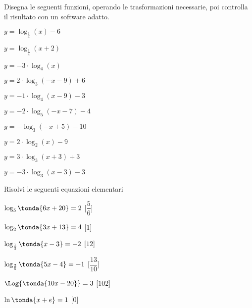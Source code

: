 \begin{esercizio}\label{ese:}
 Disegna le seguenti funzioni, operando le trasformazioni necessarie, poi 
controlla il risultato con un software adatto.
\begin{multicols}{2}
 \begin{enumeratea}
  \item  \(y=  \log_{\frac{1}{4}}\left(x \right) -6\)
  \item  \(y=  \log_{\frac{1}{4}}\left(x+2\right)\)
  \item  \(y=-3 \cdot \log_{4}\left(x\right)\)
  \item  \(y= 2 \cdot \log_{3}\left(-x-9\right) +6\)
  \item  \(y=-1 \cdot \log_{4}\left(x-9\right) -3\)
  \item  \(y=-2 \cdot \log_{5}\left(-x-7\right) -4\)
  \item  \(y= - \log_{3}\left(-x+5\right) -10\)
  \item  \(y= 2 \cdot \log_{2}\left(x \right) -9\)
  \item  \(y= 3 \cdot \log_{3}\left(x+3\right) +3\)
  \item  \(y= -3 \cdot \log_{3}\left(x-3\right) -3\)
 \end{enumeratea}
\end{multicols}
\end{esercizio}


\begin{esercizio}\label{ese:}
 Risolvi le seguenti equazioni elementari
\begin{multicols}{2}
 \begin{enumeratea}
  \item  \(\log_{5}{\tonda{6 x +20}} = 2\)
   \hfill [\( \dfrac{5}{6}\)]
  \item  \(\log_{2}{\tonda{3 x +13}} = 4\)
   \hfill [\( 1\)]
   \item  \(\log_{\frac{1}{3}}{\tonda{x-3}} = -2\)
   \hfill [\(12\)]
   \item  \(\log_{\frac{2}{5}}{\tonda{5 x -4}} = -1\)
   \hfill [\( \dfrac{13}{10}\)]
   \item  \(\Log{\tonda{10x-20}} = 3\)
   \hfill [\(102\)]
   \item  \(\ln{\tonda{x+e}} = 1\)
   \hfill [\(0\)]
 \end{enumeratea}
\end{multicols}
\end{esercizio}

